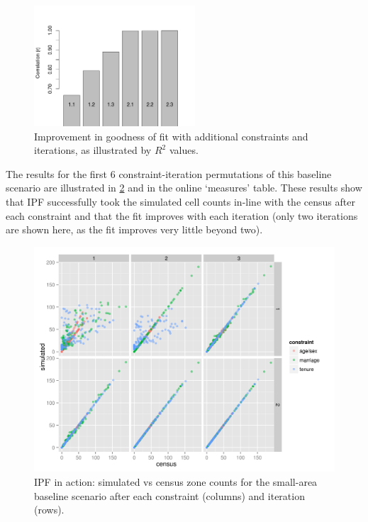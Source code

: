 \documentclass[a4paper,10pt]{article}
\begin{document}
\begin{figure}[h]
 \begin{center}
  \includegraphics[width=6cm]{corr-baseline}
 \end{center}
\caption{Improvement in goodness of fit with additional constraints and iterations, 
as illustrated by $R^2$ values.}
\label{fnconscor}
\end{figure}

The results for the first 6 constraint-iteration permutations 
of this baseline scenario are illustrated in \cref{fipfinac} and %
in the online `measures' table. These results show that IPF successfully 
took the simulated cell counts in-line with the census after each constraint 
and that the fit improves with each iteration (only two iterations are 
shown here, as the fit improves very little beyond two).

\begin{figure}
 \begin{center}
  \includegraphics[width=12cm]{ipfinac}
 \end{center}
\caption{IPF in action: simulated vs census zone counts for the small-area baseline scenario after each constraint (columns) and iteration (rows).}
\label{fipfinac}
\end{figure}
\end{document}
